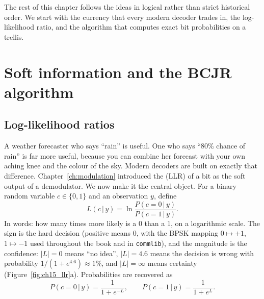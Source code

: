 The rest of this chapter follows the ideas in logical rather than strict historical order. We
start with the currency that every modern decoder trades in, the log-likelihood ratio, and the
algorithm that computes exact bit probabilities on a trellis.

\section{Soft information and the BCJR algorithm}
\label{sec:ch15:soft}

\subsection{Log-likelihood ratios}

A weather forecaster who says ``rain'' is useful. One who says ``80\% chance of rain'' is far more
useful, because you can combine her forecast with your own aching knee and the colour of the sky.
Modern decoders are built on exactly that difference. Chapter~\ref{ch:modulation} introduced the
 (LLR) of a bit as the soft output of a demodulator. We now make it the
central object. For a binary random variable $c\in\{0,1\}$ and an observation $y$, define
\begin{equation}
L(c\,|\,y)=\ln\frac{P(c=0\,|\,y)}{P(c=1\,|\,y)}.
\label{eq:ch15:llr}
\end{equation}
In words: how many times more likely is a 0 than a 1, on a logarithmic scale.
The sign is the hard decision (positive means 0, with the BPSK mapping $0\mapsto+1$,
$1\mapsto-1$ used throughout the book and in \texttt{commlib}), and the magnitude is the
confidence: $|L|=0$ means ``no idea'', $|L|=4.6$ means the decision is wrong with probability
$1/(1+e^{4.6})\approx1\%$, and $|L|=\infty$ means certainty (Figure~\ref{fig:ch15_llr}a).
Probabilities are recovered as
\begin{equation}
P(c=0\,|\,y)=\frac{1}{1+e^{-L}},\qquad P(c=1\,|\,y)=\frac{1}{1+e^{L}}.
\end{equation}


